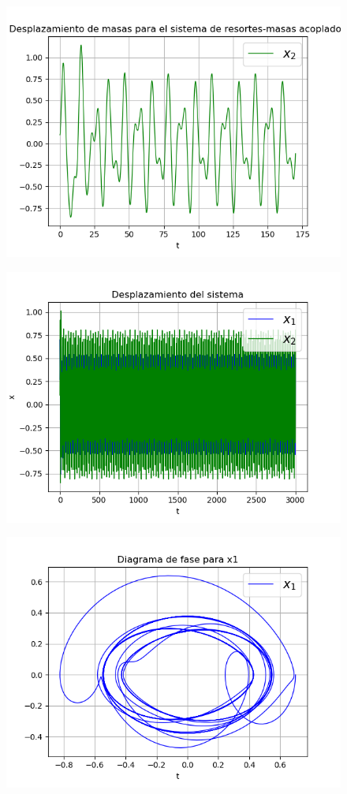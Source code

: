 \documentclass{article}
\begin{document}
\begin{figure}[H]
	\centering
    \includegraphics[width=\linewidth]{41_d2.png}
\end{figure}
\begin{figure}[H]
	\centering
    \includegraphics[width=\linewidth]{41_d12.png}
\end{figure}
\begin{figure}[H]
	\centering
    \includegraphics[width=\linewidth]{41_f1.png}
\end{figure}
\end{document}
